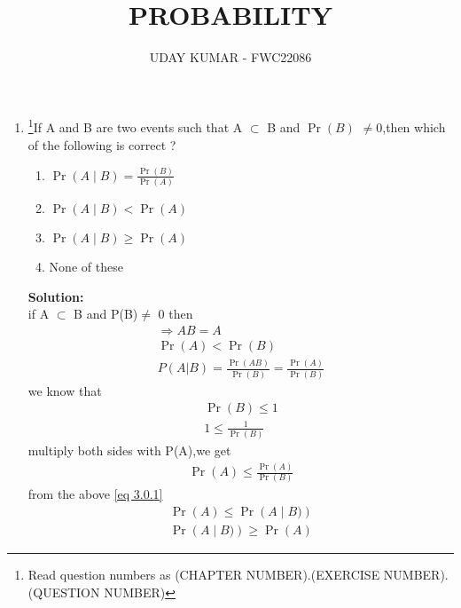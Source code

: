 \documentclass{article}
\providecommand{\pr}[1]{\ensuremath{\Pr\left(#1\right)}}
\newcommand{\solution}{\noindent \textbf{Solution: }}
\begin{document}
\title{PROBABILITY}
\author{\Large UDAY KUMAR - FWC22086}
\date{}

\maketitle

\begin{enumerate}[label=13.\arabic{enumi}.\arabic{enumii}]%
\setcounter{enumi}{3}
\setcounter{enumii}{14}

\item \footnote{Read question numbers as (CHAPTER NUMBER).(EXERCISE NUMBER).(QUESTION NUMBER)}{If A and B are two events such that A $\subset$ B and \pr{B} $\neq$0,then which of the following is correct ?}
\begin{enumerate}
\item $\pr{A \mid B} = \frac{\pr{B}}{\pr{A}}$ 
\item $\pr{A \mid B} < \pr{A}$
\item $\pr{A \mid B} \geq \pr{A}$  
\item None of these
\end{enumerate}
	\solution\\
		if A $\subset$ B and P(B)$\neq$ 0 then \\
\begin{align}
&\Rightarrow AB =A&\\
&\pr{A} < \pr{B}&\\
&P(A|B) = \frac{\pr{A B}}{\pr{B}}=\frac{\pr{A}}{\pr{B}}&\label{eq 3.0.1}
\end{align}
we know that 
\begin{align}
&\pr{B} \leq 1&\\
&1 \leq \frac{1}{\pr{B}}&
\end{align}
multiply both sides with P(A),we get 
\begin{align}
&\pr{A} \leq \frac{\pr{A}}{\pr{B}}&
\end{align}
from the above \eqref{eq 3.0.1}
\begin{align}
&\pr{A} \leq \pr{A \mid B)}&\\
&\pr{A \mid B)} \geq \pr{A}&
\end{align}
\end{enumerate}
\end{document}
